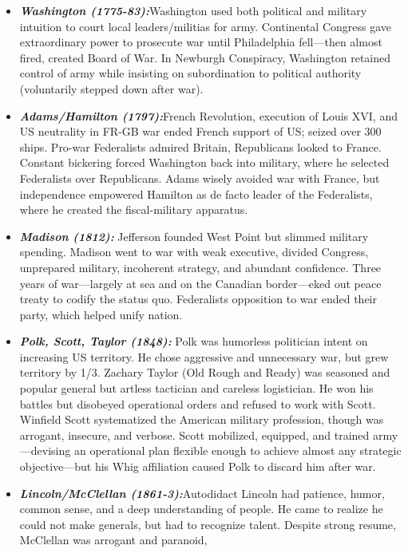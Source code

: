 \documentclass[
]{article}
\begin{document}
\begin{itemize}
\item
  \textbf{\emph{Washington (1775-83):}}Washington used both political
  and military intuition to court local leaders/militias for army.
  Continental Congress gave extraordinary power to prosecute war until
  Philadelphia fell---then almost fired, created Board of War. In
  Newburgh Conspiracy, Washington retained control of army while
  insisting on subordination to political authority (voluntarily stepped
  down after war).
\item
  \textbf{\emph{Adams/Hamilton (1797):}}French Revolution, execution of
  Louis XVI, and US neutrality in FR-GB war ended French support of US;
  seized over 300 ships. Pro-war Federalists admired Britain,
  Republicans looked to France. Constant bickering forced Washington
  back into military, where he selected Federalists over Republicans.
  Adams wisely avoided war with France, but independence empowered
  Hamilton as de facto leader of the Federalists, where he created the
  fiscal-military apparatus.
\item
  \textbf{\emph{Madison (1812):}} Jefferson founded West Point but
  slimmed military spending. Madison went to war with weak executive,
  divided Congress, unprepared military, incoherent strategy, and
  abundant confidence. Three years of war---largely at sea and on the
  Canadian border---eked out peace treaty to codify the status quo.
  Federalists opposition to war ended their party, which helped unify
  nation.
\item
  \textbf{\emph{Polk, Scott, Taylor (1848):}} Polk was humorless
  politician intent on increasing US territory. He chose aggressive and
  unnecessary war, but grew territory by 1/3. Zachary Taylor (Old Rough
  and Ready) was seasoned and popular general but artless tactician and
  careless logistician. He won his battles but disobeyed operational
  orders and refused to work with Scott. Winfield Scott systematized the
  American military profession, though was arrogant, insecure, and
  verbose. Scott mobilized, equipped, and trained army---devising an
  operational plan flexible enough to achieve almost any strategic
  objective---but his Whig affiliation caused Polk to discard him after
  war.
\item
  \textbf{\emph{Lincoln/McClellan (1861-3):}}Autodidact Lincoln had
  patience, humor, common sense, and a deep understanding of people. He
  came to realize he could not make generals, but had to recognize
  talent. Despite strong resume, McClellan was arrogant and paranoid,

\end{itemize}
\end{document}
